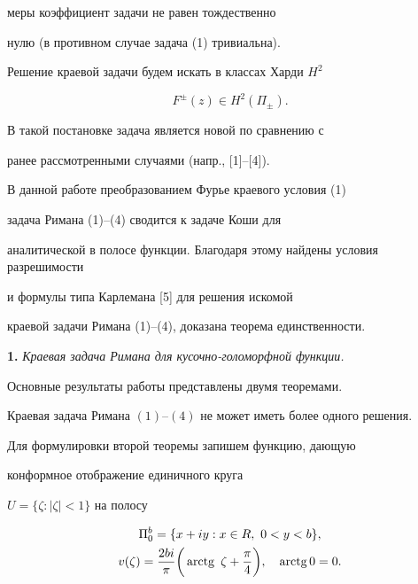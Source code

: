 меры коэффициент задачи не равен тождественно


нулю (в противном случае задача (1) тривиальна).





Решение краевой задачи будем искать в классах Харди $H^2$


\begin{equation}


F^\pm(z)\in H^2(\Pi_\pm).


\end{equation}


В такой постановке задача является новой по сравнению с


ранее рассмотренными случаями (напр., [1]--[4]).





В данной работе преобразованием Фурье краевого условия (1)


задача Римана (1)--(4) сводится к задаче Коши для


аналитической в полосе функции. Благодаря этому найдены условия разрешимости


и формулы типа Карлемана [5] для решения искомой 


краевой задачи Римана (1)--(4), доказана теорема единственности. 


\medskip





{\bf 1.} {\it Краевая задача Римана для кусочно-голоморфной функции.}


Основные результаты работы представлены двумя теоремами.





\begin{thm}


Краевая задача Римана $(1)$--$(4)$ не может иметь более одного решения.


\end{thm}





Для формулировки второй теоремы запишем функцию, дающую 


конформное отображение единичного круга


$U=\{\zeta : |\zeta|<1\}$ на полосу 


\begin{gather}


\Pi_0^b=\{x+iy :  x\in R,\ 0<y<b\},\\


v(\zeta)=\frac{2bi}{\pi}\bigg(\arctg\ \zeta+\frac{\pi}{4}\bigg),\quad


\arctg 0=0.\notag


\end{gather}


